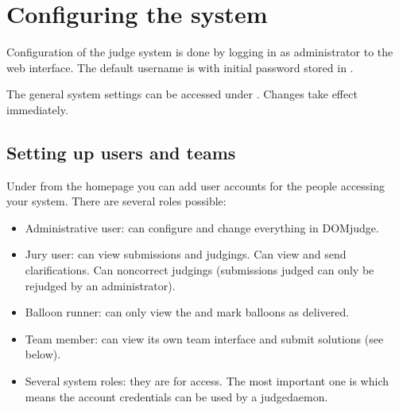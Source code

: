 \documentclass[a4paper,10pt,english,openany]{sphinxmanual}
\begin{document}
\sphinxstepscope


\section{Configuring the system}
\label{\detokenize{config-basic:configuring-the-system}}\label{\detokenize{config-basic::doc}}
\sphinxAtStartPar
Configuration of the judge system is done by logging in as administrator
to the web interface.
The default username is  with initial password stored in
.

\sphinxAtStartPar
The general system settings can be accessed under
. Changes take effect immediately.


\subsection{Setting up users and teams}
\label{\detokenize{config-basic:setting-up-users-and-teams}}
\sphinxAtStartPar
Under  from the homepage you can add user accounts for the
people accessing your system. There are several roles possible:
\begin{itemize}
\item {} 
\sphinxAtStartPar
Administrative user: can configure and change everything in DOMjudge.

\item {} 
\sphinxAtStartPar
Jury user: can view submissions and judgings. Can view
{\hyperref[\detokenize{running:clarifications}]{}} and send clarifications.
Can {\hyperref[\detokenize{judging:rejudging}]{}} non\sphinxhyphen{}correct judgings (submissions judged
 can only be rejudged by an administrator).

\item {} 
\sphinxAtStartPar
Balloon runner: can only view the {\hyperref[\detokenize{running:balloons}]{}} and mark
balloons as delivered.

\item {} 
\sphinxAtStartPar
Team member: can view its own team interface and submit solutions
(see below).

\item {} 
\sphinxAtStartPar
Several system roles: they are for {\hyperref[\detokenize{develop:api}]{}} access. The most important
one is  which means the account credentials can be used by a
judgedaemon.

\end{itemize}
\end{document}
